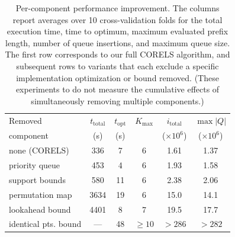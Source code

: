 \begin{table}[t]
\centering
\begin{tabular}{l | c | c | c | c | c}
Removed & $t_\text{total}$ & $t_\text{opt}$ & $K_\text{max}$ & $i_\text{total}$ & $\max | Q |$ \\
component & (s) & (s) & & ($\times 10^6$) & ($\times 10^6$) \\
\hline
none (CORELS) & 336 & 7 & 6 & 1.61 & 1.37 \\
priority queue & 453 & 4 & 6 & 1.93 & 1.58 \\
support bounds & 580 & 11 & 6 & 2.38 & 2.06 \\
permutation map & 3634 & 19 & 6 & 15.0 & 14.1 \\
lookahead bound & 4401 & 8 & 7 & 19.5 & 17.7 \\
identical pts. bound & --- & 48 & $\ge 10$ & $>286$ & $>282$ \\
\end{tabular}
\vspace{2mm}
\caption{Per-component performance improvement.
The columns report averages over 10 cross-validation folds for
the total execution time, time to optimum, maximum evaluated prefix length,
number of queue insertions, and maximum queue size.
The first row corresponds to our full CORELS algorithm,
and subsequent rows to variants that each exclude a specific
implementation optimization or bound removed.
(These experiments to do not measure the cumulative effects
of simultaneously removing multiple components.)
}
\label{tab:ablation}
\end{table}

